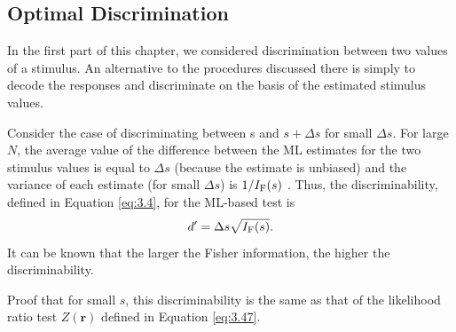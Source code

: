 \subsection{Optimal Discrimination}
\begin{rem}
   In the first part of this chapter, we considered discrimination between two
values of a stimulus. An alternative to the procedures discussed there is
simply to decode the responses and discriminate on the basis of the estimated stimulus values.
\end{rem}
\begin{prop}
  Consider the case of discriminating between s
and $s+\Delta s$ for small $\Delta s$. For large $N$, the average value of the difference
between the ML estimates for the two stimulus values is equal to
$\Delta s$ (because the estimate is unbiased) and the variance of each estimate (for small
$\Delta s$) is $1/I_{\rm{F}}(s)$ . Thus, the discriminability, defined
in Equation \ref{eq:3.4}, for the ML-based test is
\begin{equation}
  \label{eq:3.49}
  d'=\Delta s \sqrt{I_{\rm{F}}(s)}.
\end{equation}
It can be known that the larger the Fisher information, the higher the discriminability.
\end{prop}

\begin{exc}
  Proof that for small $s$, this discriminability is the same
as that of the likelihood ratio test $Z(\mathbf{r})$ defined in Equation \ref{eq:3.47}.
\end{exc}



